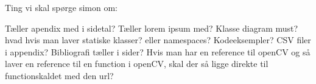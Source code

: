 Ting vi skal spørge simon om:

Tæller apendix med i sidetal?
Tæller lorem ipsum med?
Klasse diagram must? hvad hvis man laver statiske klasser? eller namespaces?
Kodeeksempler?
CSV filer i appendix?
Bibliografi tæller i sider?
Hvis man har en reference til openCV og så laver en reference til en function i openCV, skal der så ligge direkte til functionskaldet med den url?



